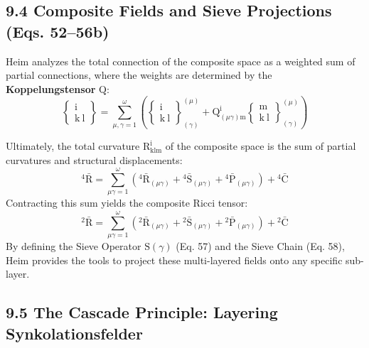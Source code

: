 \documentclass[12pt]{article}
\begin{document}
\subsection{9.4 Composite Fields and Sieve Projections (Eqs. 52--56b)}
\label{sec:field_composite_projections}

Heim analyzes the total connection of the composite space as a weighted sum of partial connections, where the weights are determined by the \textbf{Koppelungstensor} $\mathrm{Q}$:
\begin{equation}
\left\{ \begin{smallmatrix} \mathrm{i} \\ \mathrm{k} \ \mathrm{l} \end{smallmatrix} \right\} = \sum_{\mu,\gamma=1}^\omega \left( \left\{ \begin{smallmatrix} \mathrm{i} \\ \mathrm{k} \ \mathrm{l} \end{smallmatrix} \right\}^{(\mu)}_{(\gamma)} + \mathrm{Q}^\mathrm{i}_{(\mu\gamma)\mathrm{m}} \left\{ \begin{smallmatrix} \mathrm{m} \\ \mathrm{k} \ \mathrm{l} \end{smallmatrix} \right\}^{(\mu)}_{(\gamma)} \right) \tag{53}
\end{equation}

Ultimately, the total curvature $\mathrm{R}^\mathrm{i}_{\mathrm{klm}}$ of the composite space is the sum of partial curvatures and structural displacements:
\begin{equation}
{}^4\bar{\mathrm{R}} = \sum_{\mu\gamma=1}^{\omega} \left( {}^4\bar{\mathrm{R}}_{(\mu\gamma)} + {}^4\bar{\mathrm{S}}_{(\mu\gamma)} + {}^4\bar{\mathrm{P}}_{(\mu\gamma)} \right) + {}^4\bar{\mathrm{C}} \tag{55}
\end{equation}
Contracting this sum yields the composite Ricci tensor:
\begin{equation}
{}^2\bar{\mathrm{R}} = \sum_{\mu\gamma=1}^{\omega} \left( {}^2\bar{\mathrm{R}}_{(\mu\gamma)} + {}^2\bar{\mathrm{S}}_{(\mu\gamma)} + {}^2\bar{\mathrm{P}}_{(\mu\gamma)} \right) + {}^2\bar{\mathrm{C}} \tag{56}
\end{equation}
By defining the Sieve Operator $\mathrm{S}(\gamma)$ (Eq. 57) and the Sieve Chain (Eq. 58), Heim provides the tools to project these multi-layered fields onto any specific sub-layer.

\subsection{9.5 The Cascade Principle: Layering Synkolationsfelder}
\label{sec:cascade_principle_original}
\end{document}
